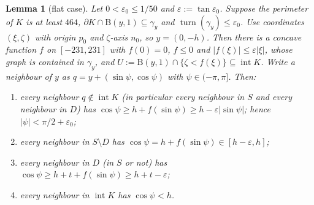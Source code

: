 \documentclass[11pt]{amsart}
\newtheorem{lemma}[theorem]{Lemma}
\theoremstyle{definition}
\theoremstyle{remark}
\newcommand{\eps}{\varepsilon}
\newcommand{\turn}{\operatorname{turn}}
\newcommand{\Dd}{\mathrm{B}}      %
\begin{document}
\begin{lemma}[flat case]\label{lem:flat}
Let $0<\eps_0\le1/50$ and $\eps:=\tan\eps_0$. Suppose the perimeter of $K$ is at least $464$, $\partial K\cap\Dd(y,1)\subseteq\gamma_y$ and $\turn(\gamma_y)\le\eps_0$. Use coordinates $(\xi,\zeta)$ with origin $p_0$ and $\zeta$-axis $n_0$, so $y=(0,-h)$. Then there is a concave function $f$ on $[-231,231]$ with $f(0)=0$, $f\le0$ and $|f(\xi)|\le\eps|\xi|$, whose graph is contained in $\gamma_y$, and $U:=\Dd(y,1)\cap\{\zeta<f(\xi)\}\subseteq\operatorname{int}K$. Write a neighbour of $y$ as $q=y+(\sin\psi,\cos\psi)$ with $\psi\in(-\pi,\pi]$. Then:
\begin{enumerate}[label=(F\arabic*)]
\item every neighbour $q\notin\operatorname{int}K$ (in particular every neighbour in $S$ and every neighbour in $D$) has $\cos\psi\ge h+f(\sin\psi)\ge h-\eps|\sin\psi|$; hence $|\psi|<\pi/2+\eps_0$;
\item every neighbour in $S\setminus D$ has $\cos\psi=h+f(\sin\psi)\in[h-\eps,h]$;
\item every neighbour in $D$ (in $S$ or not) has $\cos\psi\ge h+t+f(\sin\psi)\ge h+t-\eps$;
\item every neighbour in $\operatorname{int}K$ has $\cos\psi<h$.
\end{enumerate}
\end{lemma}
\end{document}
